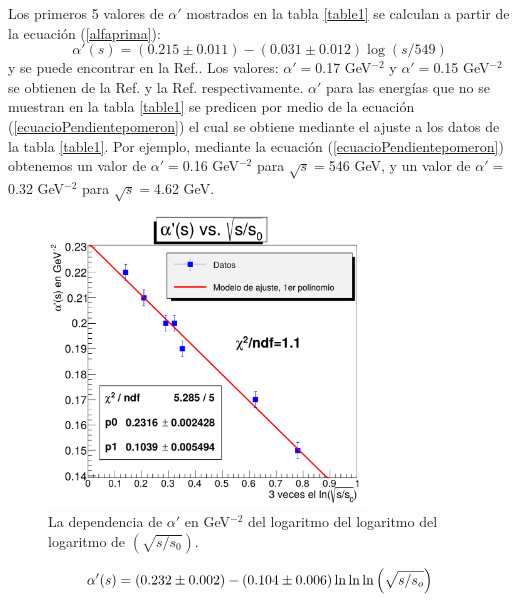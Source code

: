 Los primeros 5 valores de $\alpha'$ mostrados en la tabla \ref{table1} se calculan a partir de la ecuaci\'on (\ref{alfaprima}):
\begin{equation}\label{alfaprima}
\alpha'(s)=(0\textit{.}215\pm 0\textit{.}011)
 -(0\textit{.}031\pm 0\textit{.}012)\log(s/549)
\end{equation}
y se puede encontrar en la Ref.\cite{schlein}. Los valores: $\alpha'=$0.17 GeV$^{-2}$ y $\alpha'=$0.15  GeV$^{-2}$ se obtienen de la Ref.\cite{schlein} y la Ref.\cite{grichine} respectivamente. $\alpha'$ para las energías  que no se muestran en la tabla \ref{table1}  se predicen por medio de la ecuación (\ref{ecuacioPendientepomeron}) el cual se obtiene mediante el ajuste a los datos de la tabla \ref{table1}. Por ejemplo, mediante la ecuaci\'on (\ref{ecuacioPendientepomeron}) obtenemos un valor de $\alpha'=$0.16 GeV$^{-2}$  para $\sqrt{s}=$546 GeV, y un valor de $\alpha'=$0.32 GeV$^{-2}$  para $\sqrt{s}=$4.62 GeV.
\begin{figure}[H]
\includegraphics[width=8.5cm]{Imagenes/figurastesis/graficas/pendientepomeron.pdf}
\caption{\mismall La dependencia de $\alpha'$ en GeV$^{-2}$ del logaritmo del logaritmo del logaritmo de $\left(\sqrt{s/s_{0}}\right)$.}
\label{lafig5_18}
\end{figure}

\begin{equation}
\label{ecuacioPendientepomeron}
\alpha'(s)=(0\textup{.}232\pm 0\textup{.}002)-
(0\textup{.}104\pm 0\textup{.}006) \ln\ln\ln\left(\sqrt{s/s_o}\right)
\end{equation}

